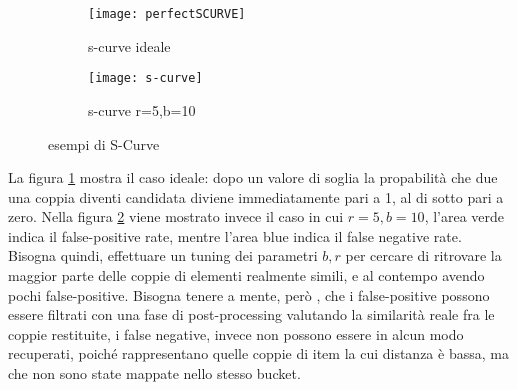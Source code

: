 \begin{figure}
    \centering
    \begin{subfigure}[b]{0.45\textwidth}
        \centering
        \texttt{[image: perfectSCURVE]}
        \caption{s-curve ideale}
        \label{fig:perfectScurve}
    \end{subfigure}
    \hfill
    \begin{subfigure}[b]{0.45\textwidth}
        \centering
        \texttt{[image: s-curve]}
       \caption{s-curve r=5,b=10}
        \label{fig:realscurve}
    \end{subfigure}
    \hfill
    
    \caption{esempi di S-Curve}
    \label{fig:scurve}
\end{figure} 
La figura \ref{fig:perfectScurve}  mostra il caso ideale: dopo un valore di soglia la propabilità che due una coppia diventi candidata diviene immediatamente pari a 1, al di sotto pari a zero. Nella figura \ref{fig:realscurve} viene mostrato invece il caso in cui $r=5,b=10$, l'area verde indica il false-positive rate, mentre l'area blue indica il false negative rate.
Bisogna quindi, effettuare un tuning dei parametri $b,r$ per cercare di ritrovare la maggior parte delle coppie di elementi realmente simili, e al contempo avendo pochi false-positive.
Bisogna tenere a mente, però , che i false-positive possono essere filtrati con una fase di post-processing valutando la similarità reale fra le coppie restituite, i false negative, invece non possono essere in alcun modo recuperati, poiché rappresentano quelle coppie di item la cui distanza è bassa, ma che non sono state mappate nello stesso bucket.

